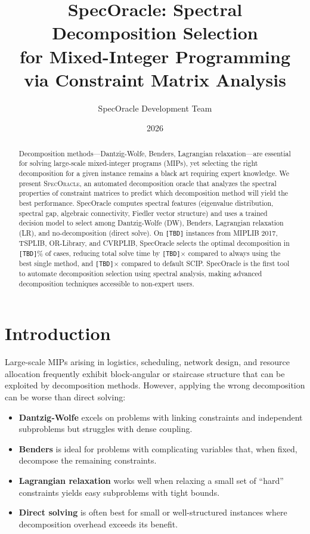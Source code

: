 \documentclass[11pt]{article}
\title{SpecOracle: Spectral Decomposition Selection\\for Mixed-Integer Programming via Constraint Matrix Analysis}
\author{SpecOracle Development Team}
\date{2026}
\begin{document}
\maketitle

\begin{abstract}
Decomposition methods---Dantzig-Wolfe, Benders, Lagrangian relaxation---are essential for solving large-scale mixed-integer programs (MIPs), yet selecting the right decomposition for a given instance remains a black art requiring expert knowledge. We present \textsc{SpecOracle}, an automated decomposition oracle that analyzes the spectral properties of constraint matrices to predict which decomposition method will yield the best performance. SpecOracle computes spectral features (eigenvalue distribution, spectral gap, algebraic connectivity, Fiedler vector structure) and uses a trained decision model to select among Dantzig-Wolfe (DW), Benders, Lagrangian relaxation (LR), and no-decomposition (direct solve). On \texttt{[TBD]} instances from MIPLIB 2017, TSPLIB, OR-Library, and CVRPLIB, SpecOracle selects the optimal decomposition in \texttt{[TBD]}\% of cases, reducing total solve time by \texttt{[TBD]}$\times$ compared to always using the best single method, and \texttt{[TBD]}$\times$ compared to default SCIP. SpecOracle is the first tool to automate decomposition selection using spectral analysis, making advanced decomposition techniques accessible to non-expert users.
\end{abstract}

\section{Introduction}
\label{sec:intro}

Large-scale MIPs arising in logistics, scheduling, network design, and resource allocation frequently exhibit block-angular or staircase structure that can be exploited by decomposition methods. However, applying the wrong decomposition can be worse than direct solving:

\begin{itemize}[leftmargin=*]
\item \textbf{Dantzig-Wolfe} excels on problems with linking constraints and independent subproblems but struggles with dense coupling.
\item \textbf{Benders} is ideal for problems with complicating variables that, when fixed, decompose the remaining constraints.
\item \textbf{Lagrangian relaxation} works well when relaxing a small set of ``hard'' constraints yields easy subproblems with tight bounds.
\item \textbf{Direct solving} is often best for small or well-structured instances where decomposition overhead exceeds its benefit.
\end{itemize}
\end{document}

